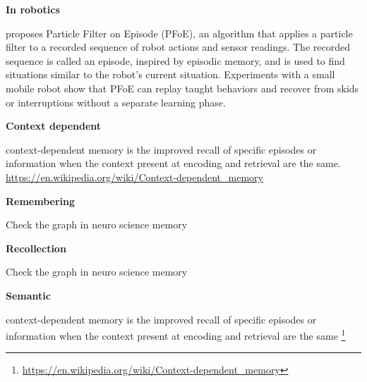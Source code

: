 \documentclass{book}
\providecommand{\ProjectDeepHeading}[2]{%
    \par\medskip\noindent\textbf{#2}\par\smallskip
}
\providecommand{\seefootnotehere}[1]{\footnote{\url{#1}}}
\begin{document}
    
    \ProjectDeepHeading{19}{In robotics}
        \cite{ueda-2019-particle-filter-on-episode} proposes Particle Filter on Episode (PFoE), an algorithm that applies a particle filter to a recorded sequence of robot actions and sensor readings. The recorded sequence is called an episode, inspired by episodic memory, and is used to find situations similar to the robot’s current situation. Experiments with a small mobile robot show that PFoE can replay taught behaviors and recover from skids or interruptions without a separate learning phase.

\ProjectDeepHeading{13}{Context dependent}


context-dependent memory is the improved recall of specific episodes or information when the context present at encoding and retrieval are the same. \url{https://en.wikipedia.org/wiki/Context-dependent_memory}

\ProjectDeepHeading{14}{Remembering}


Check the graph in neuro science memory

\ProjectDeepHeading{15}{Recollection}


Check the graph in neuro science memory

\ProjectDeepHeading{12}{Semantic}


context-dependent memory is the improved recall of specific episodes or information when the context present at encoding and retrieval are the same \seefootnotehere{https://en.wikipedia.org/wiki/Context-dependent_memory}
\end{document}
